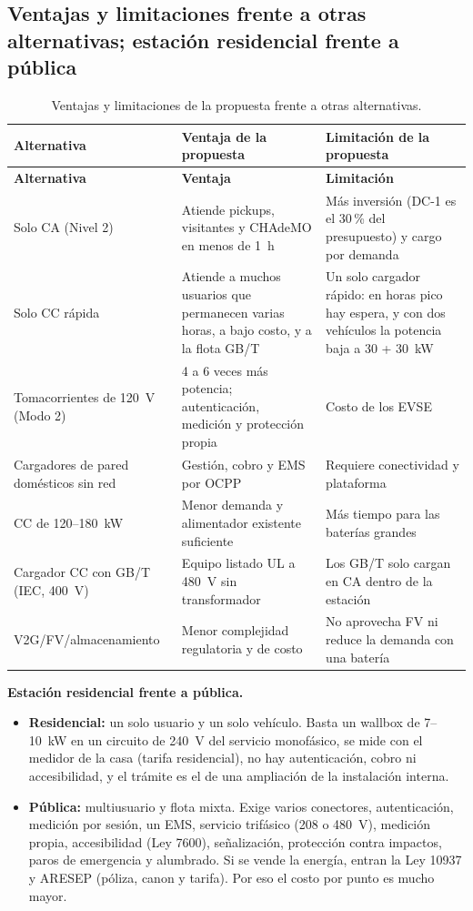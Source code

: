 \subsection{Ventajas y limitaciones frente a otras alternativas; estación residencial frente a pública}
{\small
\begin{longtable}{L{3.2cm}L{5.6cm}L{6.2cm}}
\caption{Ventajas y limitaciones de la propuesta frente a otras alternativas.}\label{tab:ventajas}\\
\toprule
\textbf{Alternativa} & \textbf{Ventaja de la propuesta} & \textbf{Limitación de la propuesta}\\
\midrule\endfirsthead
\toprule
\textbf{Alternativa} & \textbf{Ventaja} & \textbf{Limitación}\\
\midrule\endhead
Solo CA (Nivel 2) & Atiende pickups, visitantes y CHAdeMO en menos de 1~h & Más inversión (DC-1 es el 30\,\% del presupuesto) y cargo por demanda\\
Solo CC rápida & Atiende a muchos usuarios que permanecen varias horas, a bajo costo, y a la flota GB/T & Un solo cargador rápido: en horas pico hay espera, y con dos vehículos la potencia baja a 30 + 30~kW\\
Tomacorrientes de 120~V (Modo 2) & 4 a 6 veces más potencia; autenticación, medición y protección propia & Costo de los EVSE\\
Cargadores de pared domésticos sin red & Gestión, cobro y EMS por OCPP & Requiere conectividad y plataforma\\
CC de 120--180~kW & Menor demanda y alimentador existente suficiente & Más tiempo para las baterías grandes\\
Cargador CC con GB/T (IEC, 400~V) & Equipo listado UL a 480~V sin transformador & Los GB/T solo cargan en CA dentro de la estación\\
V2G/FV/almacenamiento & Menor complejidad regulatoria y de costo & No aprovecha FV ni reduce la demanda con una batería\\
\bottomrule
\end{longtable}}

\textbf{Estación residencial frente a pública.}
\begin{itemize}
\item \textbf{Residencial:} un solo usuario y un solo vehículo. Basta un wallbox de 7--10~kW en un circuito de 240~V del servicio monofásico, se mide con el medidor de la casa (tarifa residencial), no hay autenticación, cobro ni accesibilidad, y el trámite es el de una ampliación de la instalación interna.
\item \textbf{Pública:} multiusuario y flota mixta. Exige varios conectores, autenticación, medición por sesión, un EMS, servicio trifásico (208 o 480~V), medición propia, accesibilidad (Ley 7600), señalización, protección contra impactos, paros de emergencia y alumbrado. Si se vende la energía, entran la Ley 10937 y ARESEP (póliza, canon y tarifa). Por eso el costo por punto es mucho mayor.
\end{itemize}

